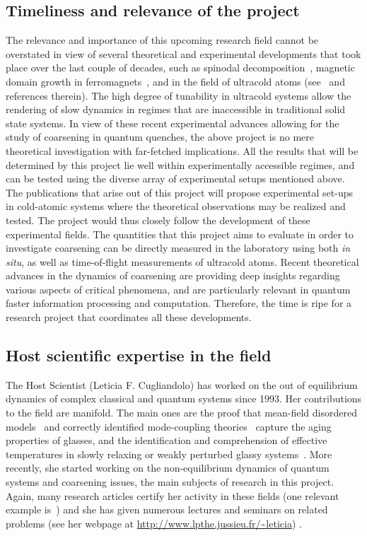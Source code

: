 \documentclass[a4paper,11pt,color]{article}
\begin{document}
\subsection{Timeliness and relevance of the project}
\label{sec:timeliness}
The relevance and importance of this upcoming research field cannot be overstated in view of several theoretical and experimental developments that took place over the last couple of decades, such as spinodal decomposition~\cite{spinodal}, magnetic domain growth in ferromagnets~\cite{puri}, and in the field of ultracold atoms (see~\cite{ultracold, colrev, fermidyn,ncnsd2012} and references therein). The high degree of tunability in ultracold systems allow the rendering of slow dynamics in regimes that are inaccessible in traditional solid state systems. In view of these recent experimental advances allowing for the study of coarsening in quantum quenches, the above project is no mere theoretical investigation with far-fetched implications. All the results that will be determined by this project lie well within experimentally accessible regimes, and can be tested using the diverse array of experimental setups mentioned above. The publications that arise out of this project will propose experimental set-ups in 
cold-atomic systems where the theoretical observations may be
realized and tested. The project would thus closely follow the development of these experimental fields. The quantities that this project aims to evaluate in order to investigate coarsening can be directly measured in the laboratory using both \textit{in situ}, as well as time-of-flight measurements of ultracold atoms. Recent theoretical advances in the dynamics of coarsening are providing deep insights regarding various aspects of critical phenomena, and are particularly relevant in quantum faster information processing and computation. Therefore, the time is ripe for a research project that coordinates all these developments.

\subsection{Host scientific expertise in the field}
\label{sec:host_expertise}

 {
The Host Scientist (Leticia F. Cugliandolo) has worked on the out of equilibrium dynamics of complex classical and quantum 
systems since 1993. Her contributions to the field are manifold. The main ones are the proof that mean-field disordered models~\cite{Cuku} and correctly identified mode-coupling theories~\cite{Bocukume} capture the aging properties of glasses, and the identification and comprehension of 
effective temperatures in slowly relaxing or weakly perturbed glassy systems~\cite{Cukupe}. More recently, she started working on 
the non-equilibrium dynamics of quantum systems and coarsening issues, the main subjects of research in this project. Again, many research 
articles certify her activity in these fields (one relevant example is~\cite{Focuga}) and she has given numerous lectures and seminars
on related problems (see her webpage at \url{http://www.lpthe.jussieu.fr/~leticia}) .
}
\end{document}
